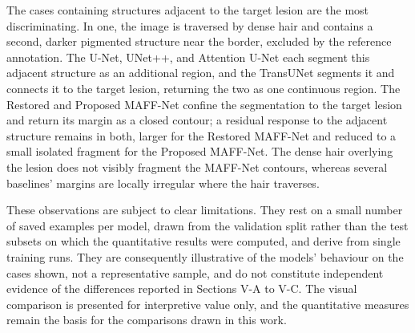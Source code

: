 The cases containing structures adjacent to the target lesion are the most discriminating. In one, the image is traversed by dense hair and contains a second, darker pigmented structure near the border, excluded by the reference annotation. The U-Net, UNet++, and Attention U-Net each segment this adjacent structure as an additional region, and the TransUNet segments it and connects it to the target lesion, returning the two as one continuous region. The Restored and Proposed MAFF-Net confine the segmentation to the target lesion and return its margin as a closed contour; a residual response to the adjacent structure remains in both, larger for the Restored MAFF-Net and reduced to a small isolated fragment for the Proposed MAFF-Net. The dense hair overlying the lesion does not visibly fragment the MAFF-Net contours, whereas several baselines' margins are locally irregular where the hair traverses.

These observations are subject to clear limitations. They rest on a small number of saved examples per model, drawn from the validation split rather than the test subsets on which the quantitative results were computed, and derive from single training runs. They are consequently illustrative of the models' behaviour on the cases shown, not a representative sample, and do not constitute independent evidence of the differences reported in Sections V-A to V-C. The visual comparison is presented for interpretive value only, and the quantitative measures remain the basis for the comparisons drawn in this work.
